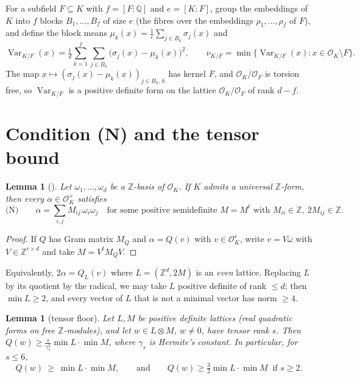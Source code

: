 \documentclass[11pt]{amsart}
\newtheorem{lemma}[theorem]{Lemma}
\theoremstyle{definition}
\DeclareMathOperator{\Var}{Var}
\newcommand{\OK}{\mathcal{O}_K}
\newcommand{\OF}{\mathcal{O}_F}
\newcommand{\Q}{\mathbb{Q}}
\newcommand{\Z}{\mathbb{Z}}
\newcommand{\nurel}{\nu_{K/F}}
\begin{document}
For a subfield $F\subseteq K$ with $f=[F:\Q]$ and $e=[K:F]$, group the embeddings of $K$ into
$f$ blocks $B_1,\dots,B_f$ of size $e$ (the fibres over the embeddings $\rho_1,\dots,\rho_f$
of $F$), and define the block means $\mu_k(x)=\frac1e\sum_{j\in B_k}\sigma_j(x)$ and
\[
\Var_{K/F}(x)=\tfrac1d\sum_{k=1}^f\sum_{j\in B_k}\bigl(\sigma_j(x)-\mu_k(x)\bigr)^2,
\qquad \nurel=\min\{\Var_{K/F}(x):x\in\OK\setminus F\}.
\]
The map $x\mapsto(\sigma_j(x)-\mu_k(x))_{j\in B_k,\,k}$ has kernel $F$, and $\OK/\OF$ is
torsion free, so $\Var_{K/F}$ is a positive definite form on the lattice $\OK/\OF$ of rank
$d-f$.

\section{Condition (N) and the tensor bound}\label{sec:tensor}

\begin{lemma}[{\cite[Prop.~3.1]{KY1}}]\label{lem:N}
Let $\omega_1,\dots,\omega_d$ be a $\Z$-basis of $\OK$.  If $K$ admits a universal $\Z$-form,
then every $\alpha\in\OK^+$ satisfies
\[
\text{(N)}\qquad \alpha=\sum_{i,j}M_{ij}\,\omega_i\omega_j\quad\text{for some positive
semidefinite } M=M^t\text{ with } M_{ii}\in\Z,\ 2M_{ij}\in\Z .
\]
\end{lemma}

\begin{proof}
If $Q$ has Gram matrix $M_Q$ and $\alpha=Q(v)$ with $v\in\OK^r$, write $v=V\omega$ with
$V\in\Z^{r\times d}$ and take $M=V^tM_QV$.
\end{proof}

Equivalently, $2\alpha=Q_{L}(v)$ where $L=(\Z^d,2M)$ is an \emph{even} lattice.  Replacing
$L$ by its quotient by the radical, we may take $L$ positive definite of rank $\le d$; then
$\min L\ge2$, and every vector of $L$ that is not a minimal vector has norm $\ge4$.

\begin{lemma}[tensor floor]\label{lem:tensor}
Let $L,M$ be positive definite lattices (real quadratic forms on free $\Z$-modules), and let
$w\in L\otimes M$, $w\ne0$, have tensor rank $s$.  Then
$Q(w)\ge\frac{s}{\gamma_s^2}\min L\cdot\min M$, where $\gamma_s$ is Hermite's constant.
In particular, for $s\le 6$,
\[
Q(w)\ \ge\ \min L\cdot\min M,\qquad\text{and}\qquad Q(w)\ge\tfrac32\min L\cdot\min M\ \text{ if } s\ge2 .
\]
\end{lemma}
\end{document}
